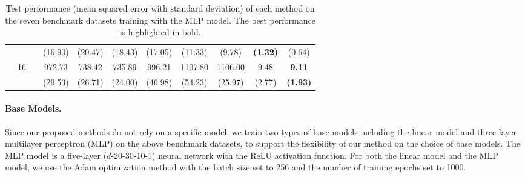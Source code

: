 \documentclass[letterpaper]{article} %
\begin{document}
\begin{table}[!t]
{\begin{tabular}{clcccccccc|cc}
\multicolumn{2}{c}{}                             &                       &                             & (16.90)                   & (20.47)                   & (18.43)                     & (17.05)                   & (11.33)                   & (9.78)                      & \textbf{(1.32)}     & (0.64)                \\
\multicolumn{2}{c}{}                             & \multirow{2}{*}{16}   &                             & 972.73                    & 738.42                    & 735.89                      & 996.21                    & 1107.80                   & 1106.00                     & 9.48                & \textbf{9.11}         \\
\multicolumn{2}{c}{}                             &                       &                             & (29.53)                   & (26.71)                   & (24.00)                     & (46.98)                   & (54.23)                   & (25.97)                     & (2.77)              & \textbf{(1.93)}      
\\
\bottomrule
\end{tabular}
}
\caption{Test performance (mean squared error with standard deviation) of each method on the seven benchmark datasets training with the MLP model. The best performance is highlighted in bold.}
\label{tab2}
\end{table}
\paragraph{Base Models.}
Since our proposed methods do not rely on a specific model, we train two types of base models including the linear model and three-layer multilayer perceptron (MLP) on the above benchmark datasets, to support the flexibility of our method on the choice of base models. The MLP model is a five-layer ($d$-20-30-10-1) neural network with the ReLU activation function. For both the linear model and the MLP model, we use the Adam optimization method \cite{kingma2015adam} with the batch size set to 256 and the number of training epochs set to 1000.
\end{document}
